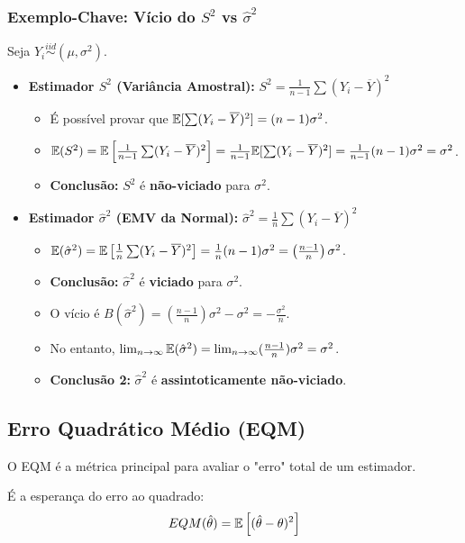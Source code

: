 \subsubsection{Exemplo-Chave: Vício do $S^2$ vs $\hat{\sigma}^2$}
Seja $Y_i \stackrel{iid}{\sim} (\mu, \sigma^2)$.
\begin{itemize}
    \item \textbf{Estimador $S^2$ (Variância Amostral):} $S^2 = \frac{1}{n-1} \sum(Y_i - \overline{Y})^2$
    \begin{itemize}
        \item É possível provar que $\mathbb{E}[\sum(Y_i - \overline{Y})^2] = (n-1)\sigma^2$.
        \item $\mathbb{E}(S^2) = \mathbb{E}\left[ \frac{1}{n-1} \sum(Y_i - \overline{Y})^2 \right] = \frac{1}{n-1} \mathbb{E}[\sum(Y_i - \overline{Y})^2] = \frac{1}{n-1} (n-1)\sigma^2 = \sigma^2$.
        \item \textbf{Conclusão:} $S^2$ é \textbf{não-viciado} para $\sigma^2$.
    \end{itemize}
    \item \textbf{Estimador $\hat{\sigma}^2$ (EMV da Normal):} $\hat{\sigma}^2 = \frac{1}{n} \sum(Y_i - \overline{Y})^2$
    \begin{itemize}
        \item $\mathbb{E}(\hat{\sigma}^2) = \mathbb{E}\left[ \frac{1}{n} \sum(Y_i - \overline{Y})^2 \right] = \frac{1}{n} (n-1)\sigma^2 = \left(\frac{n-1}{n}\right)\sigma^2$.
        \item \textbf{Conclusão:} $\hat{\sigma}^2$ é \textbf{viciado} para $\sigma^2$.
        \item O vício é $B(\hat{\sigma}^2) = (\frac{n-1}{n})\sigma^2 - \sigma^2 = -\frac{\sigma^2}{n}$.
        \item No entanto, $\lim_{n \to \infty} \mathbb{E}(\hat{\sigma}^2) = \lim_{n \to \infty} (\frac{n-1}{n})\sigma^2 = \sigma^2$.
        \item \textbf{Conclusão 2:} $\hat{\sigma}^2$ é \textbf{assintoticamente não-viciado}.
    \end{itemize}
\end{itemize}

\subsection{Erro Quadrático Médio (EQM)}
O EQM é a métrica principal para avaliar o "erro" total de um estimador.
\begin{definicao}
É a esperança do erro ao quadrado:
$$ EQM(\hat{\theta}) = \mathbb{E}\left[ (\hat{\theta} - \theta)^2 \right] $$
\end{definicao}


